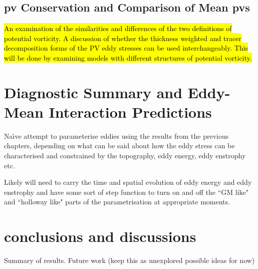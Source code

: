 \documentclass[12pt,a4paper]{report}
\begin{document}
\section{\gls{pv} Conservation and Comparison of Mean \glspl{pv}}

\hl{An examination of the similarities and differences
of the two definitions of potential vorticity. 
A discussion of whether the thickness
weighted and tracer decomposition forms of the
PV eddy stresses can be used interchangeably.
This will be done by examining models with
different structures of potential vorticity.}





\chapter{Diagnostic Summary and Eddy-Mean Interaction Predictions}

Na\"{\i}ve attempt to parameterise eddies using the 
results from the previous chapters, depending
on what can be said about how the eddy stress can
be characterised and constrained by the topography,
eddy energy, eddy enstrophy etc. 

Likely will need to carry the time and spatial
evolution of eddy energy and eddy enstrophy and have
some sort of step function to turn on and off the
``GM like" and ``holloway like" parts of the parametrisation at appropriate moments.


\chapter{conclusions and discussions}

Summary of results.
Future work (keep this as unexplored possible ideas for now)

	 \printbibliography
\end{document}
